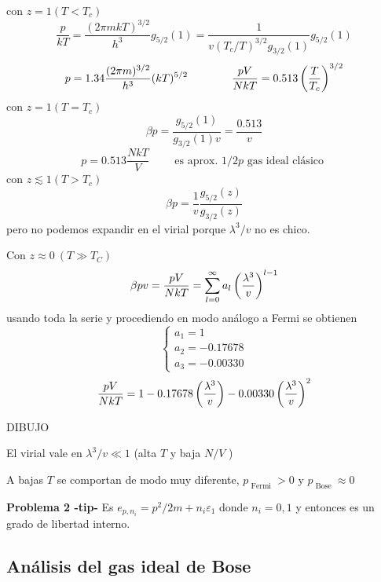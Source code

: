 \documentclass[10pt,oneside]{CBFT_book}
\begin{document}
con $ z = 1 ( T < T_c ) $
\[
	\frac{p}{kT} = \frac{(2\pi m k T)^{3/2}}{h^3} g_{5/2}(1) = 
	\frac{1}{ v (T_c/T)^{3/2} g_{3/2}(1) } g_{5/2}(1)
\]
\[
	p = 1.34 \frac{(2\pi m )^{3/2}}{h^3} (kT)^{5/2} \qquad \qquad 
	\frac{pV}{NkT} = 0.513 \left( \frac{ T }{ T_c } \right)^{3/2}
\]
con $ z = 1 ( T = T_c ) $
\[
	\beta p = \frac{ g_{5/2}(1) }{ g_{3/2}(1) v } = \frac{0.513}{v}
\]
\[
	p = 0.513 \frac{NkT}{V} \qquad \text{ es aprox. $1/2 p$ gas ideal clásico }
\]
con $ z \lesssim 1 ( T > T_c ) $
\[
	\beta p = \frac{1}{v} \frac{ g_{5/2}(z) }{ g_{3/2}(z) }
\]
pero no podemos expandir en el virial porque $ \lambda^3 / v $ no es chico.

Con $ z \approx 0 \: ( T \gg T_C ) $
\[
	\beta p v = \frac{pV}{NkT} = \sum_{l=0}^\infty a_l \left( \frac{ \lambda^3 }{ v } \right)^{l-1}
\]
usando toda la serie y procediendo en modo análogo a Fermi se obtienen
\[
	\begin{cases}
	 a_1 = 1 \\
	 a_2 = -0.17678 \\
	 a_3 = -0.00330
	\end{cases}
\]
\[
	\frac{pV}{NkT} = 1 - 0.17678 \left( \frac{ \lambda^3 }{ v } \right) - 0.00330 \left( \frac{ \lambda^3 }{ v } \right)^2
\]

DIBUJO 

El virial vale en $\lambda^3/v \ll 1$ (alta $T$ y baja $N/V$ )

A bajas $T$ se comportan de modo muy diferente, $p_{\text{ Fermi }} > 0 $ y
$p_{\text{ Bose }} \approx 0$

\begin{ejemplo}{\bf Problema 2 -tip-}
Es $e_{p,n_i} = p^2/ 2m + n_i \varepsilon_1 $ donde $n_i=0,1$ y entonces es un grado de libertad interno.
 
\end{ejemplo}


\subsection{Análisis del gas ideal de Bose}
\end{document}
